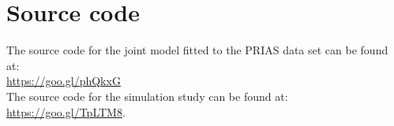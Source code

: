 \section{Source code}
The source code for the joint model fitted to the PRIAS data set can be found at:\\
\url{https://goo.gl/phQkxG}\\
The source code for the simulation study can be found at:\\
\url{https://goo.gl/TpLTM8}.